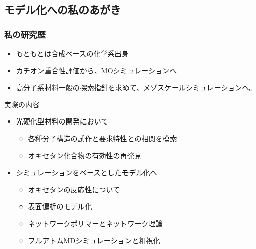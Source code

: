 \documentclass[12pt, dvipdfmx]{beamer}
\begin{document}
\subsection{モデル化への私のあがき}
\begin{frame}
    \frametitle{私の研究歴}
    \begin{itemize}
        \item もともとは合成ベースの化学系出身
        \item カチオン重合性評価から、MOシミュレーションへ
        \item 高分子系材料一般の探索指針を求めて、メゾスケールシミュレーションへ。
    \end{itemize}
        \begin{block}{実際の内容}
            \begin{itemize}
                \item 光硬化型材料の開発において
                \begin{itemize}
                    \item 各種分子構造の試作と要求特性との相関を模索
                    \item オキセタン化合物の有効性の再発見
                \end{itemize}
                \item シミュレーションをベースとしたモデル化へ
                \begin{itemize}
                    \item オキセタンの反応性について
                    \item 表面偏析のモデル化
                    \item ネットワークポリマーとネットワーク理論
                    \item フルアトムMDシミュレーションと粗視化
                \end{itemize}
            \end{itemize}
        \end{block}
\end{frame}
\end{document}

